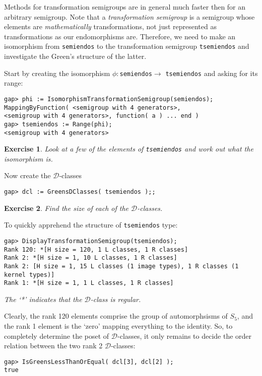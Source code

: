 \documentclass[12pt]{article}
\theoremstyle{plain} \newtheorem{Thm}{Theorem}
\theoremstyle{plain} \newtheorem{Cor}{Corollary}
\theoremstyle{plain} \newtheorem{Lemma}{Lemma}
\theoremstyle{plain} \newtheorem{Prop}{Proposition}
\theoremstyle{plain} \newtheorem{Ex}{Exercise}
\def\d{${\mathcal{D}}$}
\begin{document}
Methods for transformation semigroups are in general
much faster then for an arbitrary semigroup. Note that a 
{\em transformation semigroup} is a semigroup whose 
elements are {\em mathematically} transformations, not
just represented as transformations as our endomorphisms are.
Therefore, we need to make 
an isomorphism from {\tt semiendos} to the transformation semigroup
{\tt tsemiendos} and investigate the Green's structure of the latter. 

Start by creating the isomorphism $\phi : $\texttt{semiendos}$\rightarrow$ 
\texttt{tsemiendos} and asking for its range:
\begin{verbatim}
gap> phi := IsomorphismTransformationSemigroup(semiendos);
MappingByFunction( <semigroup with 4 generators>, 
<semigroup with 4 generators>, function( a ) ... end )
gap> tsemiendos := Range(phi);
<semigroup with 4 generators>
\end{verbatim}
\begin{Ex}
Look at a few of the elements of {\tt tsemiendos} and work out
what the isomorphism is.
\end{Ex}

Now create the $\mathcal{D}$-classes
\begin{verbatim}
gap> dcl := GreensDClasses( tsemiendos );;
\end{verbatim}

\begin{Ex}
Find the size of each of the $\mathcal{D}$-classes.
\end{Ex}

To quickly apprehend the structure of {\tt tsemiendos} type:
\begin{verbatim}
gap> DisplayTransformationSemigroup(tsemiendos);
Rank 120: *[H size = 120, 1 L classes, 1 R classes]
Rank 2: *[H size = 1, 10 L classes, 1 R classes]
Rank 2: [H size = 1, 15 L classes (1 image types), 1 R classes (1 kernel types)]
Rank 1: *[H size = 1, 1 L classes, 1 R classes]
\end{verbatim}
{\em The `*' indicates that the \d-class is regular.}

Clearly, the rank 120 elements comprise the group of automorphsisms
of $S_5$, and the rank 1 element is the `zero' mapping everything to the 
identity. So, to completely determine the poset of 
$\mathcal{D}$-classes,  it only remains to decide the order relation
between the two rank 2 \d-classes:
\begin{verbatim}
gap> IsGreensLessThanOrEqual( dcl[3], dcl[2] );
true
\end{verbatim}
\end{document}
